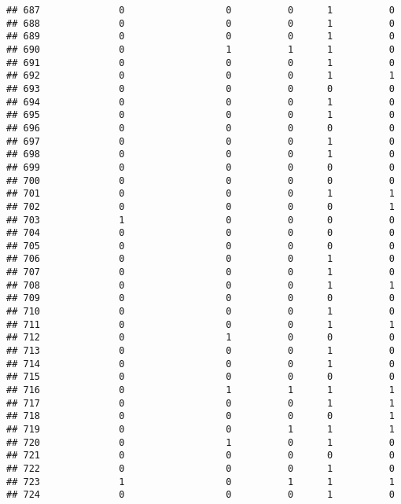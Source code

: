 \documentclass[
]{article}
\begin{document}
\begin{verbatim}
## 687              0                  0          0      1          0
## 688              0                  0          0      1          0
## 689              0                  0          0      1          0
## 690              0                  1          1      1          0
## 691              0                  0          0      1          0
## 692              0                  0          0      1          1
## 693              0                  0          0      0          0
## 694              0                  0          0      1          0
## 695              0                  0          0      1          0
## 696              0                  0          0      0          0
## 697              0                  0          0      1          0
## 698              0                  0          0      1          0
## 699              0                  0          0      0          0
## 700              0                  0          0      0          0
## 701              0                  0          0      1          1
## 702              0                  0          0      0          1
## 703              1                  0          0      0          0
## 704              0                  0          0      0          0
## 705              0                  0          0      0          0
## 706              0                  0          0      1          0
## 707              0                  0          0      1          0
## 708              0                  0          0      1          1
## 709              0                  0          0      0          0
## 710              0                  0          0      1          0
## 711              0                  0          0      1          1
## 712              0                  1          0      0          0
## 713              0                  0          0      1          0
## 714              0                  0          0      1          0
## 715              0                  0          0      0          0
## 716              0                  1          1      1          1
## 717              0                  0          0      1          1
## 718              0                  0          0      0          1
## 719              0                  0          1      1          1
## 720              0                  1          0      1          0
## 721              0                  0          0      0          0
## 722              0                  0          0      1          0
## 723              1                  0          1      1          1
## 724              0                  0          0      1          0

\end{verbatim}
\end{document}

